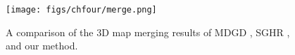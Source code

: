 \begin{figure}[H]
	\centering
	\texttt{[image: figs/chfour/merge.png]}
\color{blue}
	\caption{A comparison of the 3D map merging results of MDGD \cite{mdgd}, SGHR \cite{sghr}, and our method. }
	\label{merge}

\end{figure}

\begin{table}[H]

\caption{Comparison of 3D map merging results between MDGD \cite{mdgd}, SGHR \cite{sghr}, and our method.}
	\centering
	\resizebox{0.6\columnwidth}{!}{
		\begin{tabular}{c|c|c}
			\hline\hline
				Method $\backslash$ Metric & $\mathrm{RMSE}_{T}$ (m) $\downarrow$ & $\mathrm{RMSE}_{R}$ (rad) $\downarrow$\\ \hline
   MDGD \cite{mdgd} & 2.7883 & 1.9210  \\ \hline
   SGHR \cite{sghr} & 4.0933 & 2.3925  \\ \hline
   \textbf{Ours} & 0.2305 & 0.1771
\\ \hline  \hline
			
		\end{tabular}
	}
		\label{tabmap}
\end{table}

